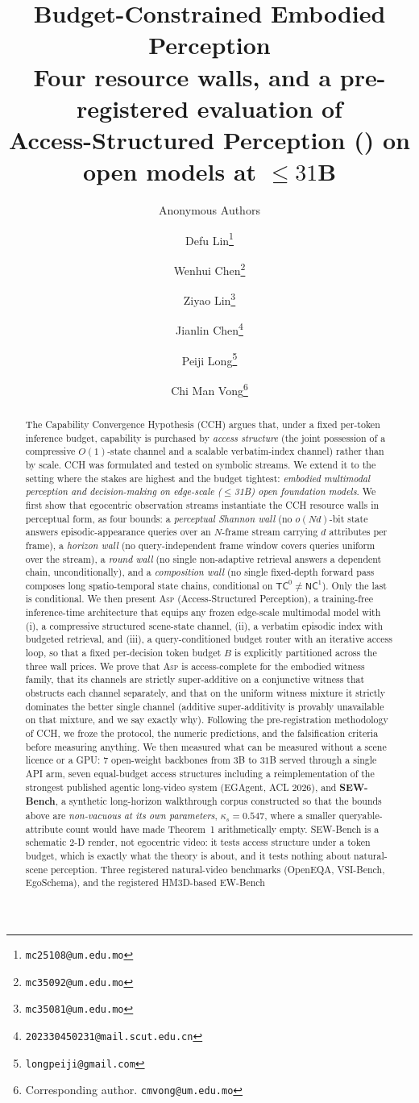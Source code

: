 \documentclass[10pt]{article}
\title{\LARGE\textbf{Budget-Constrained Embodied Perception}\\[0.45em]
\large\normalfont Four resource walls, and a pre-registered evaluation of\\
Access-Structured Perception (\ASP{}) on open models at ${\le}31$B}
\author{Anonymous Authors}
\author[1]{Defu Lin\thanks{\texttt{mc25108@um.edu.mo}}}
\author[1]{Wenhui Chen\thanks{\texttt{mc35092@um.edu.mo}}}
\author[1]{Ziyao Lin\thanks{\texttt{mc35081@um.edu.mo}}}
\author[2]{Jianlin Chen\thanks{\texttt{202330450231@mail.scut.edu.cn}}}
\author[3]{Peiji Long\thanks{\texttt{longpeiji@gmail.com}}}
\author[1]{Chi Man Vong\thanks{Corresponding author. \texttt{cmvong@um.edu.mo}}}
\affil[1]{University of Macau}
\affil[2]{South China University of Technology}
\affil[3]{Independent Researcher}
\date{}
\newcommand{\VnBackbones}{seven}
\providecommand{\VnBackbones}{--}
\renewcommand{\VnBackbones}{7}
\theoremstyle{definition}
\theoremstyle{plain}
\newcommand{\ASP}{\textsc{Asp}}
\begin{document}
\maketitle

\begin{abstract}
The Capability Convergence Hypothesis (CCH) argues that, under a fixed per-token inference budget, capability is purchased by \emph{access structure} (the joint possession of a compressive $O(1)$-state channel and a scalable verbatim-index channel) rather than by scale. CCH was formulated and tested on symbolic streams. We extend it to the setting where the stakes are highest and the budget tightest: \emph{embodied multimodal perception and decision-making on edge-scale ($\le$31B) open foundation models}. We first show that egocentric observation streams instantiate the CCH resource walls in perceptual form, as four bounds: a \emph{perceptual Shannon wall} (no $o(Nd)$-bit state answers episodic-appearance queries over an $N$-frame stream carrying $d$ attributes per frame), a \emph{horizon wall} (no query-independent frame window covers queries uniform over the stream), a \emph{round wall} (no single non-adaptive retrieval answers a dependent chain, unconditionally), and a \emph{composition wall} (no single fixed-depth forward pass composes long spatio-temporal state chains, conditional on $\mathsf{TC}^0\neq\mathsf{NC}^1$). Only the last is conditional. We then present \ASP{} (Access-Structured Perception), a training-free inference-time architecture that equips any frozen edge-scale multimodal model with (i), a compressive structured scene-state channel, (ii), a verbatim episodic index with budgeted retrieval, and (iii), a query-conditioned budget router with an iterative access loop, so that a fixed per-decision token budget $B$ is explicitly partitioned across the three wall prices. We prove that \ASP{} is access-complete for the embodied witness family, that its channels are strictly super-additive on a conjunctive witness that obstructs each channel separately, and that on the uniform witness mixture it strictly dominates the better single channel (additive super-additivity is provably unavailable on that mixture, and we say exactly why). Following the pre-registration methodology of CCH, we froze the protocol, the numeric predictions, and the falsification criteria before measuring anything. We then measured what can be measured without a scene licence or a GPU: \VnBackbones{} open-weight backbones from $3$B to $31$B served through a single API arm, seven equal-budget access structures including a reimplementation of the strongest published agentic long-video system (EGAgent, ACL 2026), and \textbf{SEW-Bench}, a synthetic long-horizon walkthrough corpus constructed so that the bounds above are \emph{non-vacuous at its own parameters}, $\kappa_s{=}0.547$, where a smaller queryable-attribute count would have made Theorem~1 arithmetically empty. SEW-Bench is a schematic 2-D render, not egocentric video: it tests access structure under a token budget, which is exactly what the theory is about, and it tests nothing about natural-scene perception. Three registered natural-video benchmarks (OpenEQA, VSI-Bench, EgoSchema), and the registered HM3D-based EW-Bench 
\end{abstract}
\end{document}
